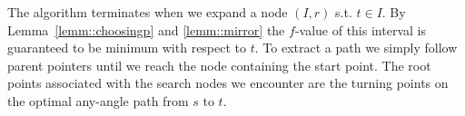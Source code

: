 
The algorithm terminates when we expand a node $(I, r)$ s.t.
$t \in I$. By Lemma~\ref{lemm::choosingp} and \ref{lemm::mirror} 
the $f$-value of this
interval is guaranteed to be minimum with respect to $t$.
To extract a path we simply follow parent pointers until we
reach the node containing the start point.
The root points associated with the search nodes we encounter
are the turning points on the optimal any-angle path from 
$s$ to $t$. 


